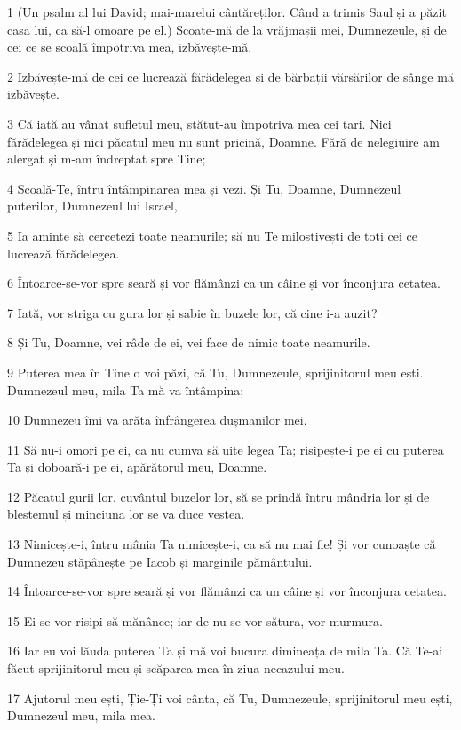 \par 1 (Un psalm al lui David; mai-marelui cântăreților. Când a trimis Saul și a păzit casa lui, ca să-l omoare pe el.) Scoate-mă de la vrăjmașii mei, Dumnezeule, și de cei ce se scoală împotriva mea, izbăvește-mă.
\par 2 Izbăvește-mă de cei ce lucrează fărădelegea și de bărbații vărsărilor de sânge mă izbăvește.
\par 3 Că iată au vânat sufletul meu, stătut-au împotriva mea cei tari. Nici fărădelegea și nici păcatul meu nu sunt pricină, Doamne. Fără de nelegiuire am alergat și m-am îndreptat spre Tine;
\par 4 Scoală-Te, întru întâmpinarea mea și vezi. Și Tu, Doamne, Dumnezeul puterilor, Dumnezeul lui Israel,
\par 5 Ia aminte să cercetezi toate neamurile; să nu Te milostivești de toți cei ce lucrează fărădelegea.
\par 6 Întoarce-se-vor spre seară și vor flămânzi ca un câine și vor înconjura cetatea.
\par 7 Iată, vor striga cu gura lor și sabie în buzele lor, că cine i-a auzit?
\par 8 Și Tu, Doamne, vei râde de ei, vei face de nimic toate neamurile.
\par 9 Puterea mea în Tine o voi păzi, că Tu, Dumnezeule, sprijinitorul meu ești. Dumnezeul meu, mila Ta mă va întâmpina;
\par 10 Dumnezeu îmi va arăta înfrângerea dușmanilor mei.
\par 11 Să nu-i omori pe ei, ca nu cumva să uite legea Ta; risipește-i pe ei cu puterea Ta și doboară-i pe ei, apărătorul meu, Doamne.
\par 12 Păcatul gurii lor, cuvântul buzelor lor, să se prindă întru mândria lor și de blestemul și minciuna lor se va duce vestea.
\par 13 Nimicește-i, întru mânia Ta nimicește-i, ca să nu mai fie! Și vor cunoaște că Dumnezeu stăpânește pe Iacob și marginile pământului.
\par 14 Întoarce-se-vor spre seară și vor flămânzi ca un câine și vor înconjura cetatea.
\par 15 Ei se vor risipi să mănânce; iar de nu se vor sătura, vor murmura.
\par 16 Iar eu voi lăuda puterea Ta și mă voi bucura dimineața de mila Ta. Că Te-ai făcut sprijinitorul meu și scăparea mea în ziua necazului meu.
\par 17 Ajutorul meu ești, Ție-Ți voi cânta, că Tu, Dumnezeule, sprijinitorul meu ești, Dumnezeul meu, mila mea.

